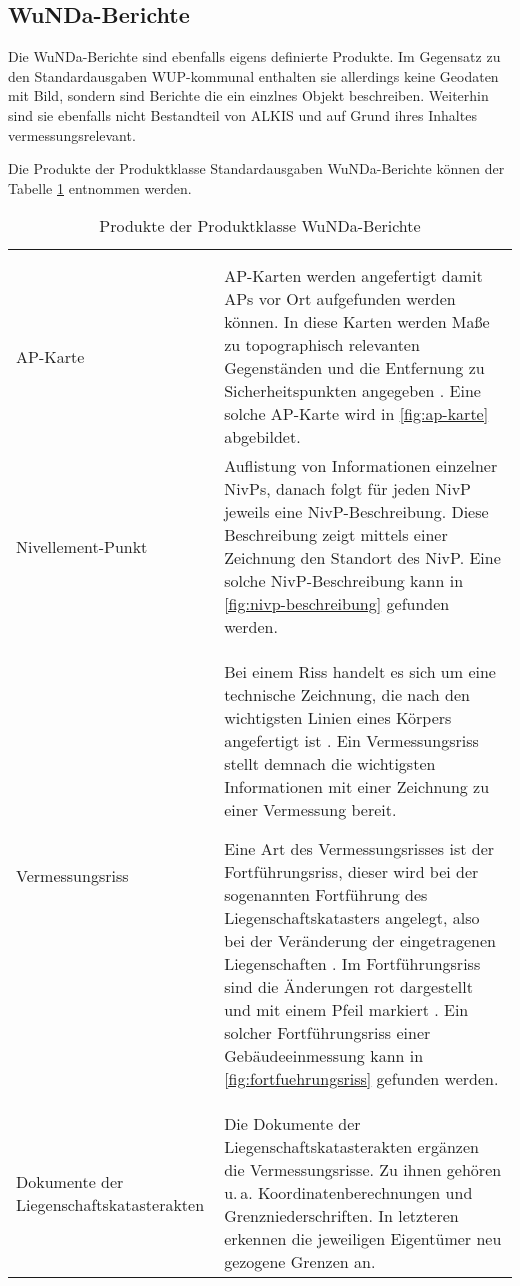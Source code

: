 \subsection{WuNDa-Berichte}
Die WuNDa-Berichte sind ebenfalls eigens definierte Produkte. Im Gegensatz zu den Standardausgaben WUP-kommunal enthalten sie allerdings keine Geodaten mit Bild, sondern sind Berichte die ein einzlnes Objekt beschreiben. Weiterhin sind sie ebenfalls nicht Bestandteil von ALKIS und auf Grund ihres Inhaltes vermessungsrelevant.

Die Produkte der Produktklasse Standardausgaben WuNDa-Berichte können der Tabelle \ref{tab-wunda-berichte} entnommen werden.
\begin{longtable}{|p{}|p{}|}	
	\caption{Produkte der Produktklasse WuNDa-Berichte} \label{tab-wunda-berichte} \\
	\hline 
	\head{Produktname}  & \head{Beschreibung} \tabularnewline
	\hline 
	\endfirsthead
	\caption{Produkte der Produktklasse WuNDa-Berichte} \\
	\hline 
	\head{Produktname}  & \head{Beschreibung} \tabularnewline
	\hline 
	\endhead
	AP-Karte
	&
	AP-Karten werden angefertigt damit \acfp{AP} vor Ort aufgefunden werden können. In diese Karten werden Maße zu topographisch relevanten Gegenständen und die Entfernung zu Sicherheitspunkten angegeben \autocite[vgl.][]{siegen-ap-karte}. Eine solche AP-Karte wird in \vref{fig:ap-karte} abgebildet.
	 \\
	\hline
	Nivellement-Punkt
	&
	Auflistung von Informationen einzelner \acfp{NivP}, danach folgt für jeden NivP jeweils eine NivP-Beschreibung. Diese Beschreibung zeigt mittels einer Zeichnung den Standort des NivP. Eine solche NivP-Beschreibung kann in \ref{fig:nivp-beschreibung} gefunden werden.  \\
	\hline
	Vermessungsriss
	&
	Bei einem Riss handelt es sich um eine technische Zeichnung, die nach den wichtigsten Linien eines Körpers angefertigt ist \autocite[vgl.][]{duden-riss}. Ein Vermessungsriss stellt demnach die wichtigsten Informationen mit einer Zeichnung zu einer Vermessung bereit.
	
	Eine Art des Vermessungsrisses ist der Fortführungsriss, dieser wird bei der sogenannten Fortführung des Liegenschaftskatasters angelegt, also bei der Veränderung der eingetragenen Liegenschaften \autocite[vgl.][]{vermpedia-fortfuehrung}.
	Im Fortführungsriss sind die Änderungen rot dargestellt und mit einem Pfeil markiert \autocite[vgl.][]{stelling-fortfuehrung}. Ein solcher Fortführungsriss einer Gebäudeeinmessung kann in \ref{fig:fortfuehrungsriss} gefunden werden.
	 \\
	\hline
	Dokumente der Liegenschaftskatasterakten
	&
	Die Dokumente der Liegenschaftskatasterakten ergänzen die Vermessungsrisse. Zu ihnen gehören u.\,a. Koordinatenberechnungen und Grenzniederschriften. In letzteren erkennen die jeweiligen Eigentümer neu gezogene Grenzen an.  \\
	\hline
\end{longtable} 
	
